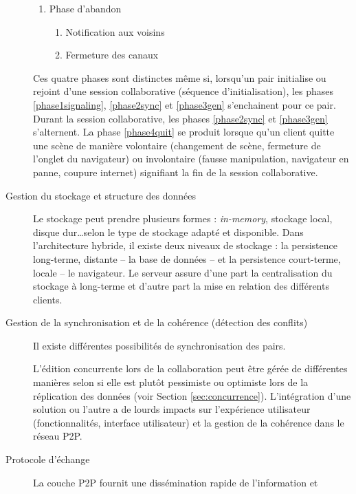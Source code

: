 \begin{description}
\begin{enumerate}
		\item Phase d'abandon
		\label{phase4quit}
		\begin{enumerate}
			\item Notification aux voisins 
			\item Fermeture des canaux
		\end{enumerate}
	\end{enumerate}
	
	Ces quatre phases sont distinctes même si, lorsqu'un pair initialise ou rejoint 
	d'une 
	session collaborative (séquence d'initialisation), les phases 
	\ref{phase1signaling}, \ref{phase2sync} et \ref{phase3gen} s'enchainent pour 
	ce pair. Durant la session collaborative, les phases \ref{phase2sync} et 
	\ref{phase3gen} s'alternent. La phase \ref{phase4quit} se produit lorsque qu'un 
	client quitte une scène de manière volontaire (changement de scène, fermeture 
	de l'onglet du navigateur) ou involontaire (fausse manipulation, navigateur en 
	panne, coupure internet) signifiant la fin de la session collaborative.
	
	\item [Gestion du stockage et structure des données] 
	Le stockage peut prendre plusieurs formes : \textit{in-memory}, stockage local, 
	disque dur\dots selon le type de stockage adapté et disponible. 
	Dans l'architecture hybride, il existe deux niveaux de stockage : la persistence 
	long-terme, distante -- la base de données -- et la persistence court-terme, 
	locale -- le navigateur.
	Le serveur assure d'une part la centralisation du stockage à long-terme et 
	d'autre part la mise en relation des différents clients.
	\item [Gestion de la synchronisation et de la cohérence (détection des conflits)] 
	Il existe différentes possibilités de synchronisation des pairs. 
	
	L'édition concurrente lors de la collaboration peut être gérée de différentes 
	manières selon si elle est plutôt pessimiste ou optimiste lors de la réplication 
	des 
	données (voir Section \ref{sec:concurrence}). L'intégration d'une solution ou 
	l'autre 
	a de lourds impacts sur l'expérience utilisateur (fonctionnalités, interface 
	utilisateur) et la gestion de la cohérence dans le réseau \gls{P2P}.  
	
	\item [Protocole d'échange]
	La couche \gls{P2P} fournit une dissémination rapide de l'information et 
\end{description}


